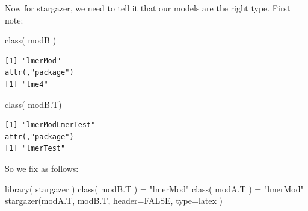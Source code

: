 \documentclass[
  letterpaper,
  DIV=11,
  numbers=noendperiod]{scrreprt}
\newenvironment{Shaded}{}{}
\newcommand{\AttributeTok}[1]{\textcolor[rgb]{0.49,0.56,0.16}{#1}}
\newcommand{\ConstantTok}[1]{\textcolor[rgb]{0.53,0.00,0.00}{#1}}
\newcommand{\FunctionTok}[1]{\textcolor[rgb]{0.02,0.16,0.49}{#1}}
\newcommand{\NormalTok}[1]{#1}
\newcommand{\OtherTok}[1]{\textcolor[rgb]{0.00,0.44,0.13}{#1}}
\newcommand{\StringTok}[1]{\textcolor[rgb]{0.25,0.44,0.63}{#1}}
\begin{document}
Now for stargazer, we need to tell it that our models are the right
type. First note:

\begin{Shaded}
\begin{Highlighting}[]
\FunctionTok{class}\NormalTok{( modB )}
\end{Highlighting}
\end{Shaded}

\begin{verbatim}
[1] "lmerMod"
attr(,"package")
[1] "lme4"
\end{verbatim}

\begin{Shaded}
\begin{Highlighting}[]
\FunctionTok{class}\NormalTok{( modB.T)}
\end{Highlighting}
\end{Shaded}

\begin{verbatim}
[1] "lmerModLmerTest"
attr(,"package")
[1] "lmerTest"
\end{verbatim}

So we fix as follows:

\begin{Shaded}
\begin{Highlighting}[]
\FunctionTok{library}\NormalTok{( stargazer )}
\FunctionTok{class}\NormalTok{( modB.T ) }\OtherTok{=} \StringTok{"lmerMod"} 
\FunctionTok{class}\NormalTok{( modA.T ) }\OtherTok{=} \StringTok{"lmerMod"} 
\FunctionTok{stargazer}\NormalTok{(modA.T, modB.T, }\AttributeTok{header=}\ConstantTok{FALSE}\NormalTok{, }\AttributeTok{type=}\StringTok{\textquotesingle{}latex\textquotesingle{}}\NormalTok{ )}
\end{Highlighting}
\end{Shaded}
\end{document}
